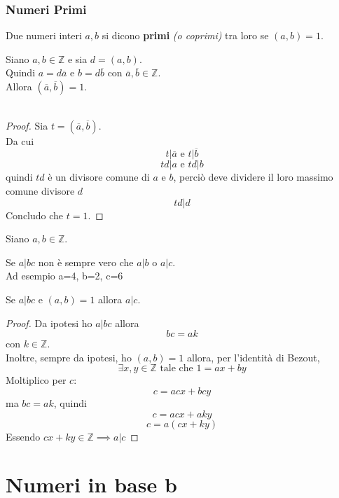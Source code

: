 \documentclass[a4paper,12pt, oneside]{book}
\begin{document}
\subsection{Numeri Primi}
\begin{definizione}
	Due numeri interi $a,b$ si dicono \textbf{primi} \textit{(o coprimi)} tra loro se $(a,b) = 1$.
\end{definizione}
\begin{osservazione}
	Siano $a,b \in \mathbb{Z}$ e sia $d=(a,b)$.\\
	Quindi $a=d\overline{a}$ e $b=d\overline{b}$ con $\overline{a}, \overline{b} \in \mathbb{Z}$.\\
	Allora $(\overline{a}, \overline{b}) = 1$.\\\\
	\begin{proof}
		Sia $t = (\overline{a}, \overline{b})$.\\
		Da cui $$t|\overline{a} \mbox{ e } t|\overline{b}$$
		$$td|a \mbox{ e } td|b$$
		quindi $td$ è un divisore comune di $a$ e $b$, perciò deve dividere il loro massimo comune divisore $d$
		$$td|d$$
		Concludo che $t = 1$.
	\end{proof}
\end{osservazione}
\begin{osservazione}
	Siano $a,b \in \mathbb{Z}$.
	\begin{shaded}
		\begin{nota}
			Se $a|bc$ non è sempre vero che $a|b$ o $a|c$.\\
			Ad esempio a=4, b=2, c=6
		\end{nota}
	\end{shaded}
	Se $a|bc$ e $(a,b) = 1$ allora $a|c$.

	\begin{proof}
		Da ipotesi ho $a|bc$ allora $$bc = ak$$
		con $k \in \mathbb{Z}$.\\
		Inoltre, sempre da ipotesi, ho $(a,b) = 1$ allora, per l'identità di Bezout,
		$$\exists x,y \in \mathbb{Z} \mbox{ tale che  } 1 = ax+by$$
		Moltiplico per $c$:
		$$c = acx+bcy$$
		ma $bc = ak$, quindi
		$$c = acx+aky$$
		$$c = a(cx+ky)$$
		Essendo $cx+ky \in \mathbb{Z} \implies a|c$
	\end{proof}

\end{osservazione}


\chapter{Numeri in base \textbf{b}}
\end{document}
